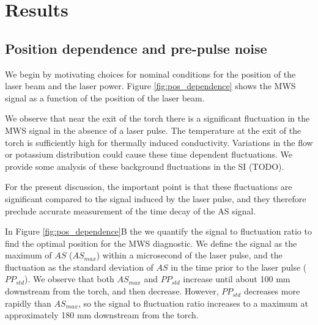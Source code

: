 

\section{Results}



\subsection{Position dependence and pre-pulse noise}

We begin by motivating choices for nominal conditions for the position of the laser beam and the laser power. Figure \ref{fig:pos_dependence} shows the MWS signal as a function of the position of the laser beam. 

We observe that near the exit of the torch there is a significant fluctuation in the MWS signal in the absence of a laser pulse. The temperature at the exit of the torch is sufficiently high for thermally induced conductivity. Variations in the flow or potassium distribution could cause these time dependent fluctuations. We provide some analysis of these background fluctuations in the SI (TODO).

For the present discussion, the important point is that these fluctuations are significant compared to the signal induced by the laser pulse, and they therefore preclude accurate measurement of the time decay of the AS signal. 

In Figure \ref{fig:pos_dependence}B the we quantify the signal to fluctuation ratio to find the optimal position for the MWS diagnostic. We define the signal as the maximum of $AS$ ($AS_{max}$) within a microsecond of the laser pulse, and the fluctuation as the standard deviation of $AS$ in the time prior to the laser pulse ($PP_{std}$). We observe that both $AS_{max}$ and $PP_{std}$ increase until about 100 mm downstream from the torch, and then decrease. However, $PP_{std}$ decreases more rapidly than $AS_{max}$, so the signal to fluctuation ratio increases to a maximum at approximately 180 mm downstream from the torch. 


